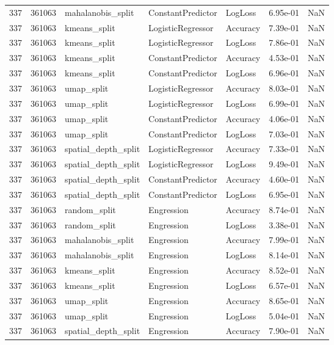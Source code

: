 \begin{tabular}{rrlllrr}
337 & 361063 & mahalanobis\_split & ConstantPredictor & LogLoss & 6.95e-01 & NaN \\
337 & 361063 & kmeans\_split & LogisticRegressor & Accuracy & 7.39e-01 & NaN \\
337 & 361063 & kmeans\_split & LogisticRegressor & LogLoss & 7.86e-01 & NaN \\
337 & 361063 & kmeans\_split & ConstantPredictor & Accuracy & 4.53e-01 & NaN \\
337 & 361063 & kmeans\_split & ConstantPredictor & LogLoss & 6.96e-01 & NaN \\
337 & 361063 & umap\_split & LogisticRegressor & Accuracy & 8.03e-01 & NaN \\
337 & 361063 & umap\_split & LogisticRegressor & LogLoss & 6.99e-01 & NaN \\
337 & 361063 & umap\_split & ConstantPredictor & Accuracy & 4.06e-01 & NaN \\
337 & 361063 & umap\_split & ConstantPredictor & LogLoss & 7.03e-01 & NaN \\
337 & 361063 & spatial\_depth\_split & LogisticRegressor & Accuracy & 7.33e-01 & NaN \\
337 & 361063 & spatial\_depth\_split & LogisticRegressor & LogLoss & 9.49e-01 & NaN \\
337 & 361063 & spatial\_depth\_split & ConstantPredictor & Accuracy & 4.60e-01 & NaN \\
337 & 361063 & spatial\_depth\_split & ConstantPredictor & LogLoss & 6.95e-01 & NaN \\
337 & 361063 & random\_split & Engression & Accuracy & 8.74e-01 & NaN \\
337 & 361063 & random\_split & Engression & LogLoss & 3.38e-01 & NaN \\
337 & 361063 & mahalanobis\_split & Engression & Accuracy & 7.99e-01 & NaN \\
337 & 361063 & mahalanobis\_split & Engression & LogLoss & 8.14e-01 & NaN \\
337 & 361063 & kmeans\_split & Engression & Accuracy & 8.52e-01 & NaN \\
337 & 361063 & kmeans\_split & Engression & LogLoss & 6.57e-01 & NaN \\
337 & 361063 & umap\_split & Engression & Accuracy & 8.65e-01 & NaN \\
337 & 361063 & umap\_split & Engression & LogLoss & 5.04e-01 & NaN \\
337 & 361063 & spatial\_depth\_split & Engression & Accuracy & 7.90e-01 & NaN \\

\end{tabular}
